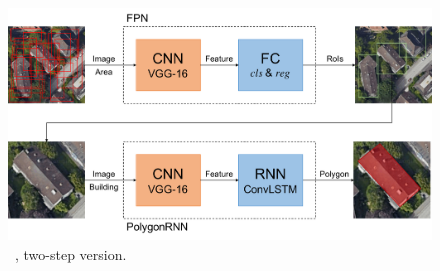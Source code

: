 \begin{figure}[!h]
	\centering
	\includegraphics[width=\fig\textwidth]{3-15.pdf}
    \caption[\modelnameshort\ , two-step version.]{\modelnameshort\ , two-step version.}
    \label{fig:stpmod}
\end{figure}